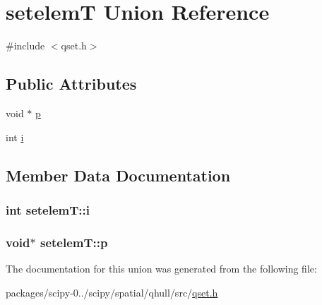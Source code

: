 \hypertarget{unionsetelemT}{}\section{setelem\+T Union Reference}
\label{unionsetelemT}


{\ttfamily \#include $<$qset.\+h$>$}

\subsection*{Public Attributes}
\begin{DoxyCompactItemize}
\item 
void $\ast$ \hyperlink{unionsetelemT_aef6933a73cfe3f78c5b2a00b35beff87}{p}
\item 
int \hyperlink{unionsetelemT_acab288ea0cd14707aac8159aa4dccd69}{i}
\end{DoxyCompactItemize}


\subsection{Member Data Documentation}
\hypertarget{unionsetelemT_acab288ea0cd14707aac8159aa4dccd69}{}
\subsubsection[{i}]{\setlength{\rightskip}{0pt plus 5cm}int setelem\+T\+::i}\label{unionsetelemT_acab288ea0cd14707aac8159aa4dccd69}
\hypertarget{unionsetelemT_aef6933a73cfe3f78c5b2a00b35beff87}{}
\subsubsection[{p}]{\setlength{\rightskip}{0pt plus 5cm}void$\ast$ setelem\+T\+::p}\label{unionsetelemT_aef6933a73cfe3f78c5b2a00b35beff87}


The documentation for this union was generated from the following file\+:\begin{DoxyCompactItemize}
\item 
packages/scipy-\/0../scipy/spatial/qhull/src/\hyperlink{qset_8h}{qset.\+h}\end{DoxyCompactItemize}
